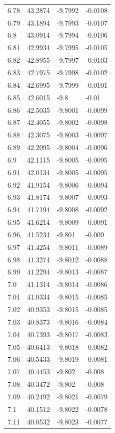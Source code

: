 \begin{tabular}{llll}
6.78 & 43.2874 & -9.7992 & -0.0108 \\
6.79 & 43.1894 & -9.7993 & -0.0107 \\
6.8 & 43.0914 & -9.7994 & -0.0106 \\
6.81 & 42.9934 & -9.7995 & -0.0105 \\
6.82 & 42.8955 & -9.7997 & -0.0103 \\
6.83 & 42.7975 & -9.7998 & -0.0102 \\
6.84 & 42.6995 & -9.7999 & -0.0101 \\
6.85 & 42.6015 & -9.8 & -0.01 \\
6.86 & 42.5035 & -9.8001 & -0.0099 \\
6.87 & 42.4055 & -9.8002 & -0.0098 \\
6.88 & 42.3075 & -9.8003 & -0.0097 \\
6.89 & 42.2095 & -9.8004 & -0.0096 \\
6.9 & 42.1115 & -9.8005 & -0.0095 \\
6.91 & 42.0134 & -9.8005 & -0.0095 \\
6.92 & 41.9154 & -9.8006 & -0.0094 \\
6.93 & 41.8174 & -9.8007 & -0.0093 \\
6.94 & 41.7194 & -9.8008 & -0.0092 \\
6.95 & 41.6214 & -9.8009 & -0.0091 \\
6.96 & 41.5234 & -9.801 & -0.009 \\
6.97 & 41.4254 & -9.8011 & -0.0089 \\
6.98 & 41.3274 & -9.8012 & -0.0088 \\
6.99 & 41.2294 & -9.8013 & -0.0087 \\
7.0 & 41.1314 & -9.8014 & -0.0086 \\
7.01 & 41.0334 & -9.8015 & -0.0085 \\
7.02 & 40.9353 & -9.8015 & -0.0085 \\
7.03 & 40.8373 & -9.8016 & -0.0084 \\
7.04 & 40.7393 & -9.8017 & -0.0083 \\
7.05 & 40.6413 & -9.8018 & -0.0082 \\
7.06 & 40.5433 & -9.8019 & -0.0081 \\
7.07 & 40.4453 & -9.802 & -0.008 \\
7.08 & 40.3472 & -9.802 & -0.008 \\
7.09 & 40.2492 & -9.8021 & -0.0079 \\
7.1 & 40.1512 & -9.8022 & -0.0078 \\
7.11 & 40.0532 & -9.8023 & -0.0077 \\

\end{tabular}
